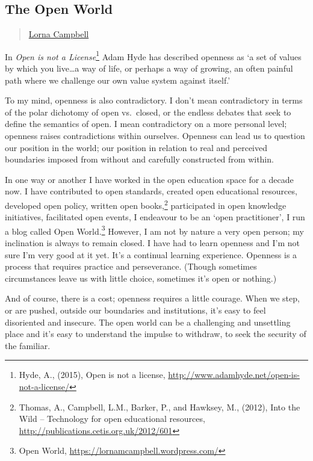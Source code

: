 \subsection{The Open World}\label{the-open-world}

\begin{quote}
\hyperlink{lorna-campbell}{Lorna Campbell}
\end{quote}

In \emph{Open is not a License}\footnote{Hyde, A., (2015), Open is not a
  license, \url{http://www.adamhyde.net/open-is-not-a-license/}} Adam
Hyde has described openness as `a set of values by which you
live\ldots{}a way of life, or perhaps a way of growing, an often painful
path where we challenge our own value system against itself.'

To my mind, openness is also contradictory. I don't mean contradictory
in terms of the polar dichotomy of open vs.~closed, or the endless
debates that seek to define the semantics of open. I mean contradictory
on a more personal level; openness raises contradictions within
ourselves. Openness can lead us to question our position in the world;
our position in relation to real and perceived boundaries imposed from
without and carefully constructed from within.

In one way or another I have worked in the open education space for a
decade now. I have contributed to open standards, created open
educational resources, developed open policy, written open
books,\footnote{Thomas, A., Campbell, L.M., Barker, P., and Hawksey, M.,
  (2012), Into the Wild -- Technology for open educational resources,
  \url{http://publications.cetis.org.uk/2012/601}} participated in open
knowledge initiatives, facilitated open events, I endeavour to be an
`open practitioner', I run a blog called Open World.\footnote{Open
  World, \url{https://lornamcampbell.wordpress.com/}} However, I am not
by nature a very open person; my inclination is always to remain closed.
I have had to learn openness and I'm not sure I'm very good at it yet.
It's a continual learning experience. Openness is a process that
requires practice and perseverance. (Though sometimes circumstances
leave us with little choice, sometimes it's open or nothing.)

And of course, there is a cost; openness requires a little courage. When
we step, or are pushed, outside our boundaries and institutions, it's
easy to feel disoriented and insecure. The open world can be a
challenging and unsettling place and it's easy to understand the impulse
to withdraw, to seek the security of the familiar.

